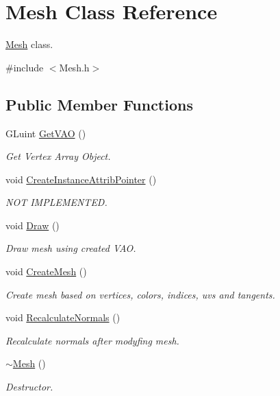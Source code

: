 \hypertarget{class_mesh}{}\section{Mesh Class Reference}
\label{class_mesh}


\mbox{\hyperlink{class_mesh}{Mesh}} class.  




{\ttfamily \#include $<$Mesh.\+h$>$}

\subsection*{Public Member Functions}
\begin{DoxyCompactItemize}
\item 
G\+Luint \mbox{\hyperlink{class_mesh_ad4917bc56c71f31974af4be3eb90a390}{Get\+V\+AO}} ()
\begin{DoxyCompactList}\small\item\em Get Vertex Array Object. \end{DoxyCompactList}\item 
void \mbox{\hyperlink{class_mesh_a916735fb6745a444abc21011e11ed3e4}{Create\+Instance\+Attrib\+Pointer}} ()
\begin{DoxyCompactList}\small\item\em N\+OT I\+M\+P\+L\+E\+M\+E\+N\+T\+ED. \end{DoxyCompactList}\item 
void \mbox{\hyperlink{class_mesh_afdd95c079fd0442afef8a6c421c8bfc9}{Draw}} ()
\begin{DoxyCompactList}\small\item\em Draw mesh using created V\+AO. \end{DoxyCompactList}\item 
void \mbox{\hyperlink{class_mesh_ab4d75bfd6e4603aa774eba1cfb83bffe}{Create\+Mesh}} ()
\begin{DoxyCompactList}\small\item\em Create mesh based on vertices, colors, indices, uvs and tangents. \end{DoxyCompactList}\item 
void \mbox{\hyperlink{class_mesh_a2688a608e0185faef28105fae57ad76d}{Recalculate\+Normals}} ()
\begin{DoxyCompactList}\small\item\em Recalculate normals after modyfing mesh. \end{DoxyCompactList}\item 
\mbox{\hyperlink{class_mesh_a5efe4da1a4c0971cfb037bd70304c303}{$\sim$\+Mesh}} ()
\begin{DoxyCompactList}\small\item\em Destructor. \end{DoxyCompactList}\end{DoxyCompactItemize}
